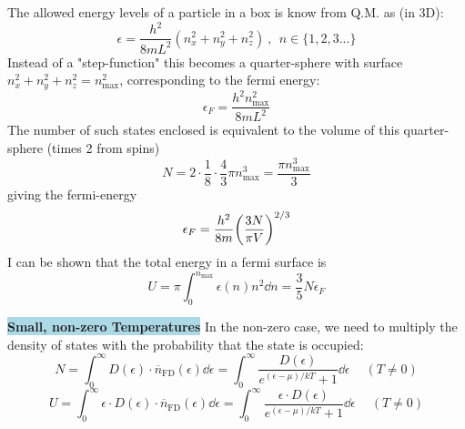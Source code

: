 \documentclass[8pt, a4paper]{extarticle}
\renewcommand{\exp}{e^}
\renewcommand{\exp}{e^}
\renewcommand{\bar}{\overline}
\newcommand{\bll}{\colorbox{lightblue}}
\begin{document}
\begin{twocolumn}
\begin{framed}
The allowed energy levels of a particle in a box is know from Q.M. as (in 3D):
\vspace{-.2cm}\[
    \epsilon = \frac{h^2}{8mL^2}(n_x^2 + n_y^2 + n_z^2) \ , \ \ n \in \{1,2,3...\}
\]
Instead of a "step-function" this becomes a quarter-sphere with surface $n_x^2 + n_y^2 + n_z^2 = n_\text{max}^2$, corresponding to the fermi energy:
\vspace{-.2cm}\[
    \epsilon_F = \frac{h^2n_\text{max}^2}{8mL^2}
\]
The number of such states enclosed is equivalent to the volume of this quarter-sphere (times 2 from spins)
\vspace{-.2cm}\[
    N = 2\cdot\frac{1}{8}\cdot \frac{4}{3}\pi n_\text{max}^3 = \frac{\pi n_\text{max}^3}{3}
\]\vspace{-.2cm}
giving the fermi-energy
\vspace{-.2cm}\[
    \epsilon_F = \frac{h^2}{8m}\qty(\frac{3N}{\pi V})^{2/3}
\]\vspace{-.2cm}
I can be shown that the total energy in a fermi surface is 
\[
    U = \pi\int_0^{n_\text{max}}\epsilon(n)n^2 \dd{n} = \frac{3}{5}N \epsilon_F
\]\vspace{-.2cm}


\bll{\textbf{Small, non-zero Temperatures}}
In the non-zero case, we need to multiply the density of states with the probability that the state is occupied:
\[
    N = \int_0^\infty D(\epsilon)\cdot \bar{n}_\text{FD}(\epsilon) \dd{\epsilon} = \int_0^\infty \frac{D(\epsilon)}{\exp{(\epsilon-\mu)/kT} + 1} \dd{\epsilon} \quad\ (T \neq 0)
\]
\[
    U = \int_0^\infty\epsilon \cdot D(\epsilon)\cdot \bar{n}_\text{FD}(\epsilon) \dd{\epsilon} = \int_0^\infty \frac{\epsilon\cdot D(\epsilon)}{\exp{(\epsilon-\mu)/kT} + 1} \dd{\epsilon} \quad\ (T \neq 0)
\]
\end{framed}


\end{twocolumn}
\end{document}

